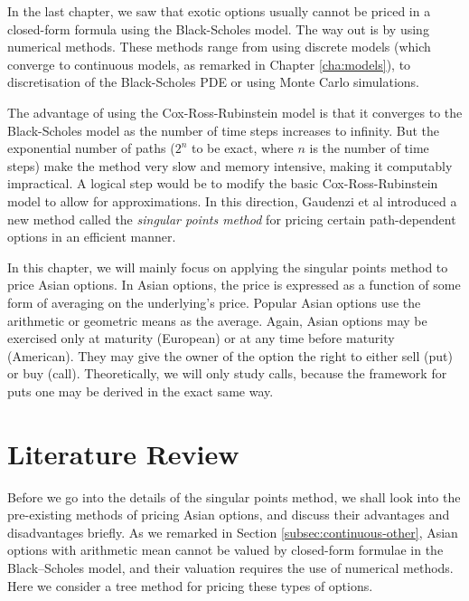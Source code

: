 

In the last chapter, we saw that exotic options usually cannot be priced in a closed-form formula using the Black-Scholes model. The way out is by using numerical methods. These methods range from using discrete models (which converge to continuous models, as remarked in Chapter \ref{cha:models}), to discretisation of the Black-Scholes PDE or using Monte Carlo simulations.

The advantage of using the Cox-Ross-Rubinstein model is that it converges to the Black-Scholes model as the number of time steps increases to infinity. But the exponential number of paths ($2^n$ to be exact, where $n$ is the number of time steps) make the method very slow and memory intensive, making it computably impractical. A logical step would be to modify the basic Cox-Ross-Rubinstein model to allow for approximations. In this direction, Gaudenzi et al\cite{Gaudenzi2010} introduced a new method called the \emph{singular points method} for pricing certain path-dependent options in an efficient manner.

In this chapter, we will mainly focus on applying the singular points method to price Asian options. In Asian options, the price is expressed as a function of some form of averaging on the underlying's price. Popular Asian options use the arithmetic or geometric means as the average. Again, Asian options may be exercised only at maturity (European) or at any time before maturity (American). They may give the owner of the option the right to either sell (put) or buy (call). Theoretically, we will only study calls, because the framework for puts one may be derived in the exact same way.



\section{Literature Review}
\label{sec:asian-literature-review}

Before we go into the details of the singular points method, we shall look into the pre-existing methods of pricing Asian options, and discuss their advantages and disadvantages briefly. As we remarked in Section \ref{subsec:continuous-other}, Asian options with arithmetic mean cannot be valued by closed-form formulae in the Black–Scholes model, and their valuation requires the use of numerical methods. Here we consider a tree method for pricing these types of options.

